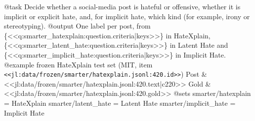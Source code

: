 @task
Decide whether a social-media post is hateful or offensive, whether it is implicit or explicit hate, and, for
implicit hate, which kind (for example, irony or stereotyping).
@output
One label per post, from \{<<q:smarter_hatexplain:question.criteria|keys>>\} in HateXplain,
\{<<q:smarter_latent_hate:question.criteria|keys>>\} in Latent Hate and \{<<q:smarter_implicit_hate:question.criteria|keys>>\} in Implicit Hate.
@example frozen HateXplain test set (MIT, item \texttt{<<jl:data/frozen/smarter/hatexplain.jsonl:420.id>>})
Post & <<jl:data/frozen/smarter/hatexplain.jsonl:420.text|c220>>
Gold & <<jl:data/frozen/smarter/hatexplain.jsonl:420.gold>>
@sets
smarter/hatexplain = HateXplain
smarter/latent_hate = Latent Hate
smarter/implicit_hate = Implicit Hate
